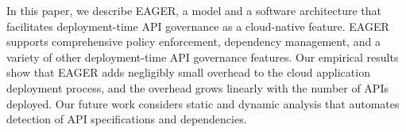 In this paper, we describe EAGER, a model and a software architecture that 
facilitates deployment-time API governance as a cloud-native feature. EAGER supports comprehensive policy
enforcement, dependency management, and a variety of other deployment-time API
governance features.
Our empirical results 
show that EAGER adds negligibly small overhead to the cloud application 
deployment process, and the overhead grows linearly
with the number of APIs deployed.
Our future work considers static and dynamic analysis
that automates detection of API specifications and dependencies.
